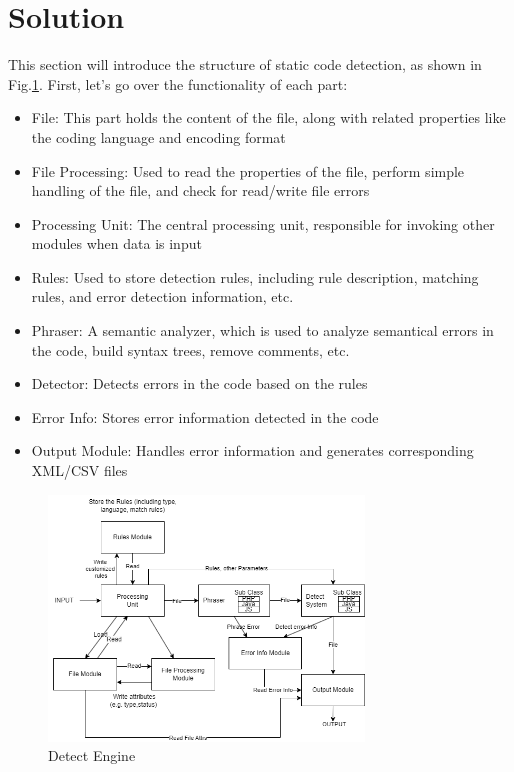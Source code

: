 \documentclass[journal]{IEEEtran}
\begin{document}
\section{Solution}
\label{sec:solution}
\noindent This section will introduce the structure of static code detection, as shown in Fig.\ref{fig:detectengine}. First, let's go over the functionality of each part:
\begin{itemize}
  \item File: This part holds the content of the file, along with related properties like the coding language and encoding format
  \item File Processing: Used to read the properties of the file, perform simple handling of the file, and check for read/write file errors
  \item Processing Unit: The central processing unit, responsible for invoking other modules when data is input
  \item Rules: Used to store detection rules, including rule description, matching rules, and error detection information, etc.
  \item Phraser: A semantic analyzer, which is used to analyze semantical errors in the code, build syntax trees, remove comments, etc.
  \item Detector: Detects errors in the code based on the rules
  \item Error Info: Stores error information detected in the code
  \item Output Module: Handles error information and generates corresponding XML/CSV files
\end{itemize}

\begin{figure}[h]
  \centering
  \includegraphics[width=3.3in]{figures/detectengine.png}
  \caption{Detect Engine}
  \label{fig:detectengine}
  \end{figure}
\end{document}
